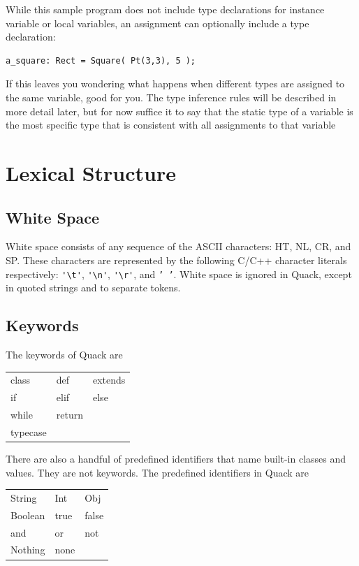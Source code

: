 \documentclass[11pt]{article}
\begin{document}
While this sample program does not include type declarations for
instance variable or local variables, an assignment can optionally
include a type declaration: 

\begin{verbatim}
a_square: Rect = Square( Pt(3,3), 5 );
\end{verbatim}

If this leaves you wondering what happens when different types are
assigned to the same variable, good for you.  The type inference rules
will be described in more detail later, but for now suffice it to say that
the static type of a variable is the most specific type that is 
consistent with all assignments to that variable


\section{Lexical Structure}
\label{lex-struct}

\subsection{White Space}

White space consists of any sequence of the ASCII characters:
HT, NL, CR, and SP\@.
These characters are represented by the following C/C++ character
literals respectively:  \verb|'\t'|, \verb|'\n'|,
\verb|'\r'|, and \texttt{' '}. 
White space is ignored in Quack, except in quoted strings and to
separate tokens.  

\subsection{Keywords}

The keywords of Quack  are 

\bgroup \bf
\begin{tabular}{lll}
class&def&extends\\
if&elif&else\\
while&return\\
typecase\\
\end{tabular}
\egroup

\noindent 
There are also a handful of predefined identifiers
that name built-in classes and values.  They are not
keywords. The predefined identifiers in Quack are 

\bgroup \bf
\begin{tabular}{lll}
String&Int&Obj\\
Boolean&true&false\\
and&or&not\\
Nothing&none\\
\end{tabular}
\egroup
\end{document}
